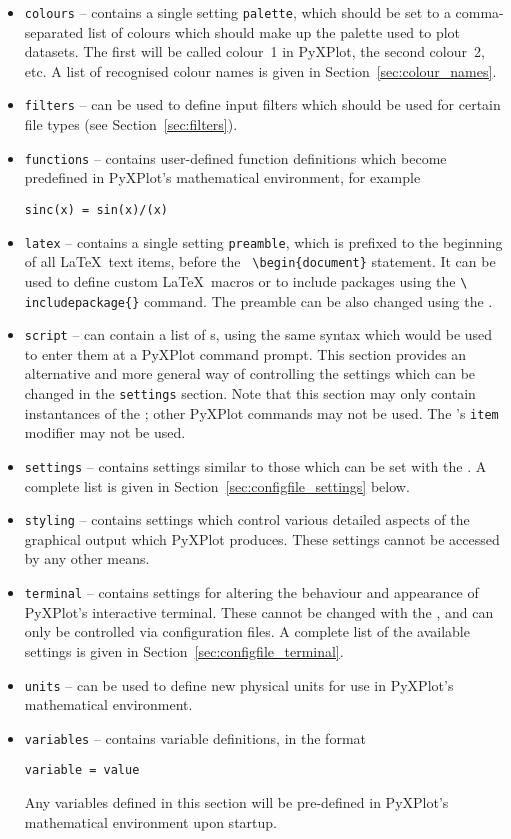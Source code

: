 \begin{itemize}
\item {\tt colours} -- contains a single setting {\tt palette}, which should be
set to a comma-separated list of colours which should make up the palette used
to plot datasets. The first will be called colour~1 in PyXPlot, the second
colour~2, etc. A list of recognised colour names is given in
Section~\ref{sec:colour_names}.
\item {\tt filters} -- can be used to define input filters which should be used
for certain file types (see Section~\ref{sec:filters}).
\item {\tt functions} -- contains user-defined function definitions which
become predefined in PyXPlot's mathematical environment, for example
\begin{verbatim}
sinc(x) = sin(x)/(x)
\end{verbatim}
\item {\tt latex} -- contains a single setting {\tt preamble}, which is
prefixed to the beginning of all \LaTeX\ text items, before the {\tt
\textbackslash begin\{document\}} statement. It can be used to define custom
\LaTeX\ macros or to include packages using the {\tt \textbackslash
includepackage\{\}} command.  The preamble can be also changed using the
.
\item {\tt script} -- can contain a list of s, using the same
syntax which would be used to enter them at a PyXPlot command prompt. This
section provides an alternative and more general way of controlling the
settings which can be changed in the {\tt settings} section. Note that this
section may only contain instantances of the ; other PyXPlot
commands may not be used. The 's {\tt item} modifier may not be
used.
\item {\tt settings} -- contains settings similar to those which can be set
with the . A complete list is given in
Section~\ref{sec:configfile_settings} below.
\item {\tt styling} -- contains settings which control various detailed aspects
of the graphical output which PyXPlot produces. These settings cannot be
accessed by any other means.
\item {\tt terminal} -- contains settings for altering the behaviour and
appearance of PyXPlot's interactive terminal. These cannot be changed with the
, and can only be controlled via configuration files. A complete
list of the available settings is given in
Section~\ref{sec:configfile_terminal}.
\item {\tt units} -- can be used to define new physical units for use in
PyXPlot's mathematical environment.
\item {\tt variables} -- contains variable definitions, in the format
\begin{verbatim}
variable = value
\end{verbatim}
Any variables defined in this section will be pre-defined in PyXPlot's
mathematical environment upon startup.

\end{itemize}


